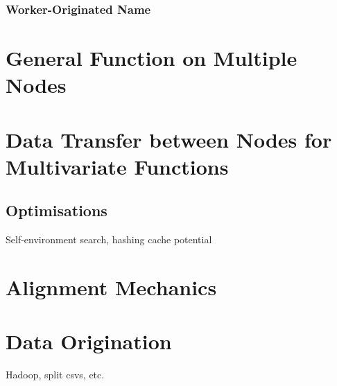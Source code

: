 \documentclass[a4paper,10pt]{article}
\begin{document}
\subsubsection{Worker-Originated Name}

\section{General Function on Multiple Nodes}
\section{Data Transfer between Nodes for Multivariate Functions}
\subsection{Optimisations}
Self-environment search, hashing cache potential
\section{Alignment Mechanics}
\section{Data Origination}
Hadoop, split csvs, etc.
\end{document}
